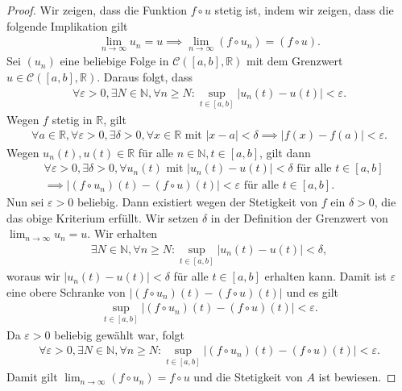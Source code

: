\documentclass[draft,a5paper]{article}
\begin{document}
\begin{proof}
  Wir zeigen, dass die Funktion
  \(f \circ u\) stetig ist, indem wir zeigen, dass die folgende
  Implikation gilt
  \begin{align*}
    \lim_{n \to \infty}{u_{n}} = u \implies \lim_{n \to \infty}{(f \circ u_{n})} =
    (f \circ u).
  \end{align*}
  Sei \((u_{n})\) eine beliebige Folge in
  \(\mathcal{C} ([a, b], \mathbb{R})\) mit dem Grenzwert
  \(u \in \mathcal{C} ([a, b], \mathbb{R})\). Daraus folgt, dass
  \begin{align*}
    \forall \varepsilon > 0, \exists N \in \mathbb{N}, \forall n \ge N\colon \sup_{t \in [a, b]}{|u_{n}(t) - u(t)|} < \varepsilon.
  \end{align*}
  Wegen \(f\) stetig in \(\mathbb{R}\), gilt
  \begin{align*}
    \forall a \in \mathbb{R}, \forall \varepsilon > 0, \exists \delta > 0, \forall x \in \mathbb{R} \text{ mit } |x - a| < \delta
    \implies |f(x) - f(a)| < \varepsilon.
  \end{align*}
  Wegen \(u_{n}(t), u(t) \in \mathbb{R}\) für alle \(n \in \mathbb{N}, t \in [a, b]\), gilt
  dann
  \begin{align*}
    &\forall \varepsilon > 0, \exists \delta > 0, \forall u_{n}(t) \text{ mit } |u_{n}(t) - u(t)| < \delta
    \text{ für alle } t \in [a, b] \\
    &\implies |(f \circ u_{n})(t) - (f \circ
    u)(t)| < \varepsilon \text{ für alle } t \in [a, b].
  \end{align*}
  Nun sei \(\varepsilon > 0\) beliebig.  Dann existiert wegen der Stetigkeit von
  \(f\) ein \(\delta > 0\), die das obige Kriterium erfüllt.  Wir setzen
  \(\delta\) in der Definition der Grenzwert von \(\lim_{n \to \infty}{u_{n}} =
  u\).  Wir erhalten
  \begin{align*}
    \exists N \in \mathbb{N}, \forall n \ge N\colon \sup_{t \in [a, b]}{|u_{n}(t) - u(t)|} < \delta,
  \end{align*}
  woraus wir \(|u_{n}(t) - u(t)| < \delta\) für alle \(t \in [a, b]\)
  erhalten kann.  Damit ist \(\varepsilon\) eine obere Schranke von
  \(|(f \circ u_{n})(t) - (f \circ u)(t)|\) und es gilt
  \begin{align*}
    \sup_{t \in [a, b]}{|(f \circ u_{n})(t) - (f \circ
    u)(t)|} < \varepsilon.
  \end{align*}
  Da \(\varepsilon > 0\) beliebig gewählt war, folgt
  \begin{align*}
    \forall \varepsilon > 0, \exists N \in \mathbb{N}, \forall n \ge N\colon \sup_{t \in [a, b]}{|(f \circ u_{n})(t) - (f \circ
    u)(t)|} < \varepsilon.
  \end{align*}
  Damit gilt \(\lim_{n \to \infty}{(f \circ u_{n}) = f \circ u}\) und die
  Stetigkeit von \(A\) ist bewiesen.
\end{proof}
\end{document}
